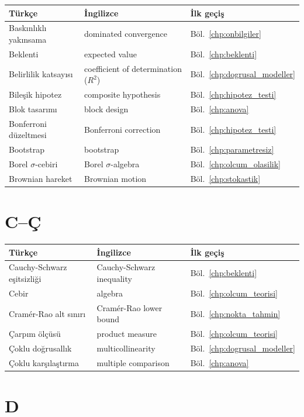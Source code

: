 \begin{tabular}{p{5cm}p{5cm}p{4cm}}
\hline
\textbf{Türkçe} & \textbf{İngilizce} & \textbf{İlk geçiş} \\
\hline
Baskınlıklı yakınsama & dominated convergence & Böl.~\ref{chp:onbilgiler} \\
Beklenti & expected value & Böl.~\ref{chp:beklenti} \\
Belirlilik katsayısı & coefficient of determination ($R^2$) & Böl.~\ref{chp:dogrusal_modeller} \\
Bileşik hipotez & composite hypothesis & Böl.~\ref{chp:hipotez_testi} \\
Blok tasarımı & block design & Böl.~\ref{chp:anova} \\
Bonferroni düzeltmesi & Bonferroni correction & Böl.~\ref{chp:hipotez_testi} \\
Bootstrap & bootstrap & Böl.~\ref{chp:parametresiz} \\
Borel $\sigma$-cebiri & Borel $\sigma$-algebra & Böl.~\ref{chp:olcum_olasilik} \\
Brownian hareket & Brownian motion & Böl.~\ref{chp:stokastik} \\
\hline
\end{tabular}

\section{C--Ç}

\begin{tabular}{p{5cm}p{5cm}p{4cm}}
\hline
\textbf{Türkçe} & \textbf{İngilizce} & \textbf{İlk geçiş} \\
\hline
Cauchy-Schwarz eşitsizliği & Cauchy-Schwarz inequality & Böl.~\ref{chp:beklenti} \\
Cebir & algebra & Böl.~\ref{chp:olcum_teorisi} \\
Cramér-Rao alt sınırı & Cramér-Rao lower bound & Böl.~\ref{chp:nokta_tahmin} \\
Çarpım ölçüsü & product measure & Böl.~\ref{chp:olcum_teorisi} \\
Çoklu doğrusallık & multicollinearity & Böl.~\ref{chp:dogrusal_modeller} \\
Çoklu karşılaştırma & multiple comparison & Böl.~\ref{chp:anova} \\
\hline
\end{tabular}

\section{D}

